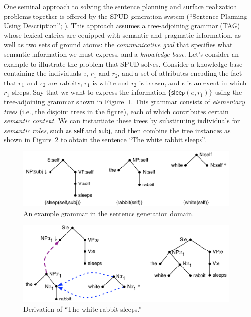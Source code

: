 \documentclass[letterpaper]{article}
\begin{document}
One seminal approach to solving the sentence planning and surface
realization problems together is offered by the SPUD generation system
(``Sentence Planning Using Description''; \citealt{Stone2003a}). This
approach assumes a tree-adjoining grammar (TAG) \citep{joshi;etal1997}
whose lexical entries are equipped with semantic and pragmatic
information, as well as two sets of ground atoms: the
\emph{communicative goal} that specifies what semantic information we
must express, and a \emph{knowledge base}. Let's consider an example
to illustrate the problem that SPUD solves. Consider a knowledge base
containing the individuals $e$, $r_1$ and $r_2$, and a set of
attributes encoding the fact that $r_1$ and $r_2$ are rabbits, $r_1$
is white and $r_2$ is brown, and $e$ is an event in which $r_1$
sleeps.  Say that we want to express the information
$\{\mathsf{sleep}(e,r_1)\}$ using the tree-adjoining grammar shown in
Figure~\ref{fig:white-rabbit-sleeps-grammar}. This grammar consists of
\emph{elementary trees} (i.e., the disjoint trees in the figure), each
of which contributes certain \emph{semantic content}. We can
instantiate these trees by substituting individuals for \emph{semantic
  roles}, such as $\mathsf{self}$ and $\mathsf{subj}$, and then
combine the tree instances as shown in
Figure~\ref{fig:white-rabbit-sleeps-deriv} to obtain the sentence
``The white rabbit sleeps''.

\begin{figure}[t]
  \centering
  \includegraphics[width=0.75\columnwidth]{pic-grammar}
  \caption{An example grammar in the sentence generation domain.}
  \label{fig:white-rabbit-sleeps-grammar}
\end{figure}

\begin{figure}[t]
  \centering
  \includegraphics[width=0.75\columnwidth]{pic-derivation}
  \caption{Derivation of ``The white rabbit sleeps.''}
  \label{fig:white-rabbit-sleeps-deriv}
\end{figure}
\end{document}

